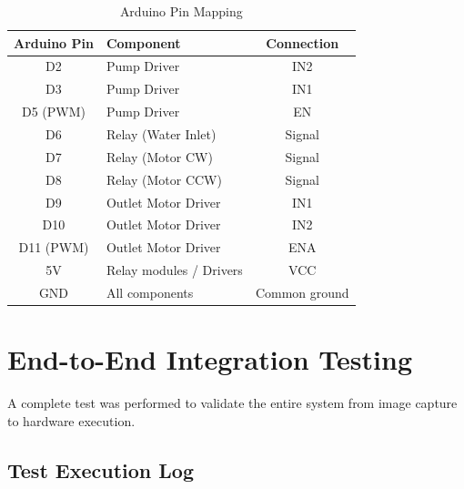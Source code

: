 \begin{table}[H]
    \centering
    \begin{tabular}{|c|l|c|}
        \hline
        \textbf{Arduino Pin} & \textbf{Component} & \textbf{Connection} \\
        \hline
        D2 & Pump Driver & IN2 \\
        D3 & Pump Driver & IN1 \\
        D5 (PWM) & Pump Driver & EN \\
        D6 & Relay (Water Inlet) & Signal \\
        D7 & Relay (Motor CW) & Signal \\
        D8 & Relay (Motor CCW) & Signal \\
        D9 & Outlet Motor Driver & IN1 \\
        D10 & Outlet Motor Driver & IN2 \\
        D11 (PWM)& Outlet Motor Driver & ENA \\
        5V & Relay modules / Drivers & VCC \\
        GND & All components & Common ground \\
        \hline
    \end{tabular}
    \caption{Arduino Pin Mapping}
    \label{tab:pinmap}
\end{table}

\section{End-to-End Integration Testing}
A complete test was performed to validate the entire system from image capture to hardware execution.

\subsection{Test Execution Log}


